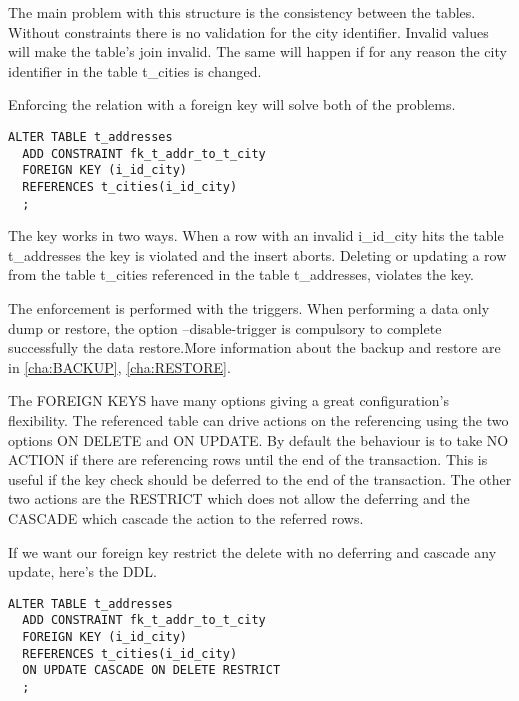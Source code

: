 The main problem with this structure is the consistency between the tables. Without constraints
there is no validation for the city identifier. Invalid values will make the table's join invalid. The
same will happen if for any reason the city identifier in the table t\_cities is changed.\newline

Enforcing the relation with a foreign key will solve both of the problems.

\begin{lstlisting}[style=pgsql]
ALTER TABLE t_addresses 
  ADD CONSTRAINT fk_t_addr_to_t_city
  FOREIGN KEY (i_id_city)
  REFERENCES t_cities(i_id_city)
  ;

\end{lstlisting}

The key works in two ways. When a row with an invalid i\_id\_city hits the table t\_addresses 
the key is violated and the insert aborts. Deleting or updating a row from the table t\_cities referenced
in the table t\_addresses, violates the key.\newline

The enforcement is performed with the triggers. When performing a data only dump or restore, the option
--disable-trigger is compulsory to complete successfully the data restore.More information about the
backup and restore are in \ref{cha:BACKUP}, \ref{cha:RESTORE}.\newline

The FOREIGN KEYS have many options giving a great configuration's flexibility. 
The referenced table can drive actions on the referencing using the two options ON DELETE and ON 
UPDATE. By default the behaviour is to take NO ACTION if there are referencing rows until the 
end of the transaction. This is useful if the key check should be deferred to the end of the 
transaction. The other two actions are the RESTRICT which does not allow the deferring and 
the CASCADE which cascade the action to the referred rows. 

If we want our foreign key restrict the delete with no deferring and cascade any update, here's the 
DDL.

\begin{lstlisting}[style=pgsql]
ALTER TABLE t_addresses 
  ADD CONSTRAINT fk_t_addr_to_t_city
  FOREIGN KEY (i_id_city)
  REFERENCES t_cities(i_id_city)
  ON UPDATE CASCADE ON DELETE RESTRICT
  ;

\end{lstlisting}

